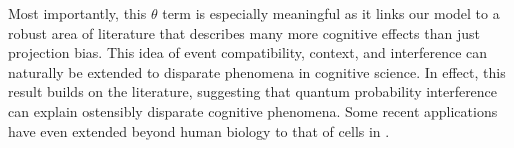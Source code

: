 \documentclass[12pt]{article}
\begin{document}
	Most importantly, this $\theta$ term is especially meaningful as it links our model to a robust area of literature that describes many more cognitive effects than just projection bias. This idea of event compatibility, context, and interference can naturally be extended to disparate phenomena in cognitive science. In effect, this result builds on the literature, suggesting that quantum probability interference can explain ostensibly disparate cognitive phenomena. Some recent applications have even extended beyond human biology to that of cells in \cite{basieva_khrennikov_ohya_yamato_2011}.	
	
	
	
		
	
\end{document}

